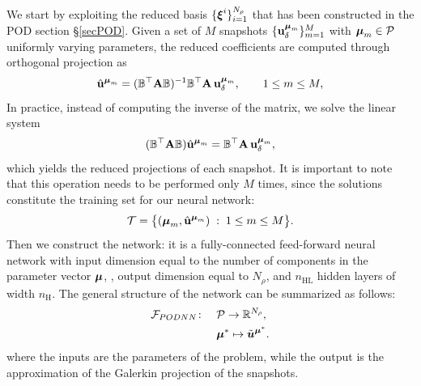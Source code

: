 \documentclass[
    conference,
    nofonttune,
    11pt
]{IEEEtran}
\begin{document}
            We start by exploiting the reduced basis $\{{\boldsymbol\xi}^i\}_{i=1}^{N_\rho}$ that has been constructed in the POD section \S{\ref{secPOD}}. Given a set of $M$ snapshots $\{\mathbf u^{{\boldsymbol\mu}_m}_\delta\}_{m=1}^M$ with ${\boldsymbol\mu}_m \in \mathcal P$ uniformly varying parameters, the reduced coefficients are computed through orthogonal projection as
            \begin{equation*}
            \hat{\mathbf u}^{{\boldsymbol\mu}_m} 
            = ({\mathbb B}^\top \mathbf A {\mathbb B})^{-1}{\mathbb B}^\top \mathbf A \, \mathbf u^{{\boldsymbol\mu}_m}_\delta,
            \qquad 1 \le m \le M,
            \end{equation*}
            In practice, instead of computing the inverse of the matrix, we solve the linear system
            \begin{equation*}
                ({\mathbb B}^\top \mathbf A {\mathbb B}) \hat{\mathbf u}^{{\boldsymbol\mu}_m} 
                = {\mathbb B}^\top \mathbf A \, \mathbf u^{{\boldsymbol\mu}_m}_\delta,
            \end{equation*}
            which yields the reduced projections of each snapshot. It is important to note that this operation needs to be performed only $M$ times, since the solutions constitute the training set for our neural network:
            \begin{equation*}
                \mathcal T = \big\{ ({\boldsymbol\mu}_m, \hat{\mathbf u}^{{\boldsymbol\mu}_m}) \; : \; 1 \le m \le M \big\}.
            \end{equation*}
            Then we construct the network: it is a fully-connected feed-forward neural network with input dimension equal to the number of components in the parameter vector ${\boldsymbol\mu}$, , output dimension equal to $N_\rho$, and $n_{\mathrm{HL}}$ hidden layers of width $n_{\mathrm H}$.  
            The general structure of the network can be summarized as follows:
            \begin{equation}
            \label{eq:podNN}
            \begin{aligned}
                \mathcal{F}_{PODNN} \colon \quad & \mathcal{P} \to \mathbb{R}^{N_\rho}, \\
                &\boldmu^* \mapsto \tilde{\boldsymbol u}^{\boldmu^*} .
            \end{aligned}
            \end{equation}
            where the inputs are the parameters of the problem, while the output is the approximation of the Galerkin projection of the snapshots. 
\end{document}

